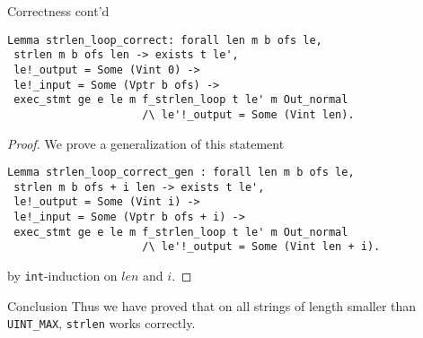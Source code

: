 \documentclass{beamer}
\begin{document}
  
\begin{frame}[fragile]{Correctness cont'd}

  
  
  \begin{lstlisting}[language=Coq]
 Lemma strlen_loop_correct: forall len m b ofs le,
 strlen m b ofs len -> exists t le',
 le!_output = Some (Vint 0) ->
 le!_input = Some (Vptr b ofs) ->
 exec_stmt ge e le m f_strlen_loop t le' m Out_normal
                     /\ le'!_output = Some (Vint len).
\end{lstlisting}

\begin{proof}
  We prove a generalization of this statement
  
 \begin{lstlisting}[language=Coq]
 Lemma strlen_loop_correct_gen : forall len m b ofs le,
 strlen m b ofs + i len -> exists t le',
 le!_output = Some (Vint i) ->
 le!_input = Some (Vptr b ofs + i) ->
 exec_stmt ge e le m f_strlen_loop t le' m Out_normal
                     /\ le'!_output = Some (Vint len + i).
\end{lstlisting}

by \texttt{int}-induction on $len$ and $i$. 

  \end{proof}

 



\end{frame}

\begin{frame}{Conclusion}
  Thus we have proved that on all strings of length smaller than
  \texttt{UINT\_MAX}, \texttt{strlen} works correctly.
  
  \end{frame}
\end{document}
